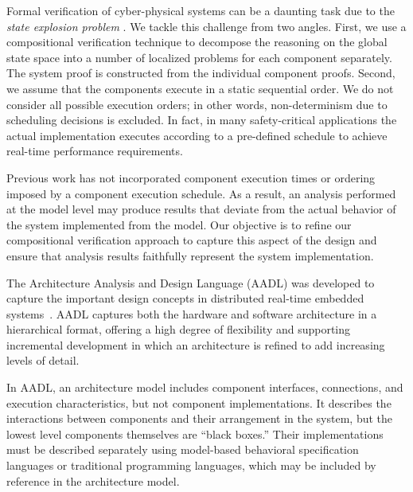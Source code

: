 
Formal verification of cyber-physical systems can be a daunting task due to the \emph{state
explosion problem} \cite{Clarke2012}. We tackle this challenge from two angles. First, we use a
compositional verification technique \cite{pnueli} \cite{cmc} to decompose the reasoning on the global state space into a
number of localized problems for each component separately. The system proof is constructed
from the individual component proofs. Second, we assume that the components execute in a static 
sequential order. We do not consider all possible execution orders; in other words, non-determinism
due to scheduling decisions is excluded. In fact, in many safety-critical applications the actual
implementation executes according to a pre-defined schedule \cite{executive} to achieve real-time performance
requirements.  

Previous work has not incorporated component execution times or ordering imposed by 
a component execution schedule. As a result, an analysis performed at the model level 
may produce results that deviate from the actual behavior of the system implemented 
from the model.  Our objective is to refine our compositional verification approach to capture 
this aspect of the design and ensure that analysis results faithfully represent the system 
implementation.  

The Architecture Analysis and Design Language (AADL) was developed to capture the important 
design concepts in distributed real-time embedded systems~\cite{FeilerModelBasedEngineering2012}. 
AADL captures both the hardware and software architecture in a hierarchical format,  
offering a high degree of flexibility and supporting incremental development 
in which an architecture is refined to add increasing levels of detail.

In AADL, an architecture model includes component interfaces, connections, and execution characteristics, but not component implementations. It describes the interactions between components and their arrangement in the system, but the lowest level 
components themselves are ``black boxes.'' Their implementations must be described separately using model-based behavioral specification languages or traditional programming languages, which may be included by reference in the architecture model.  

